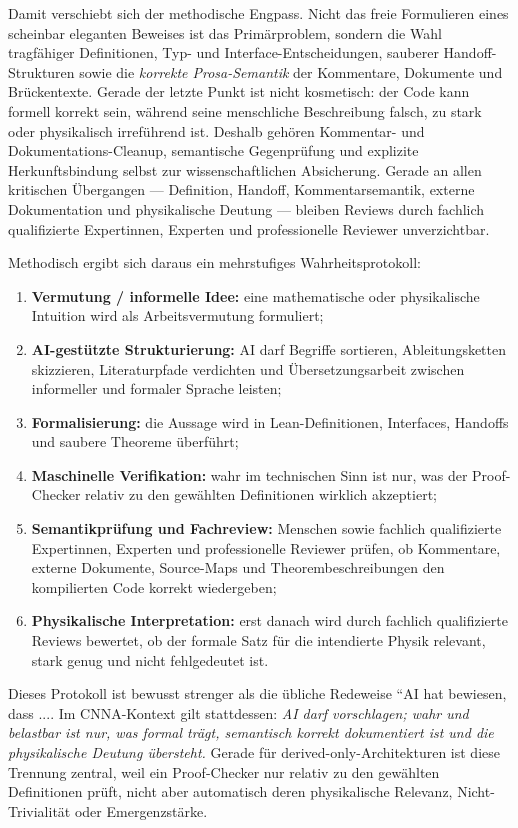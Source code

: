 \documentclass[11pt,a4paper]{article}
\begin{document}
Damit verschiebt sich der methodische Engpass. Nicht das freie Formulieren eines scheinbar eleganten
Beweises ist das Primärproblem, sondern die Wahl tragfähiger Definitionen, Typ- und
Interface-Entscheidungen, sauberer Handoff-Strukturen sowie die \emph{korrekte Prosa-Semantik} der
Kommentare, Dokumente und Brückentexte. Gerade der letzte Punkt ist nicht kosmetisch: der Code kann
formell korrekt sein, während seine menschliche Beschreibung falsch, zu stark oder physikalisch
irreführend ist. Deshalb gehören Kommentar- und Dokumentations-Cleanup, semantische
Gegenprüfung und explizite Herkunftsbindung selbst zur wissenschaftlichen Absicherung. Gerade an
allen kritischen Übergangen --- Definition, Handoff, Kommentarsemantik, externe Dokumentation und
physikalische Deutung --- bleiben Reviews durch fachlich qualifizierte Expertinnen, Experten und
professionelle Reviewer unverzichtbar.

Methodisch ergibt sich daraus ein mehrstufiges Wahrheitsprotokoll:
\begin{enumerate}
\item \textbf{Vermutung / informelle Idee:} eine mathematische oder physikalische Intuition wird als
Arbeitsvermutung formuliert;
\item \textbf{AI-gestützte Strukturierung:} AI darf Begriffe sortieren, Ableitungsketten skizzieren,
Literaturpfade verdichten und Übersetzungsarbeit zwischen informeller und formaler Sprache leisten;
\item \textbf{Formalisierung:} die Aussage wird in Lean-Definitionen, Interfaces, Handoffs und saubere
Theoreme überführt;
\item \textbf{Maschinelle Verifikation:} wahr im technischen Sinn ist nur, was der Proof-Checker relativ zu
den gewählten Definitionen wirklich akzeptiert;
\item \textbf{Semantikprüfung und Fachreview:} Menschen sowie fachlich qualifizierte Expertinnen,
Experten und professionelle Reviewer prüfen, ob Kommentare, externe Dokumente, Source-Maps und
Theorembeschreibungen den kompilierten Code korrekt wiedergeben;
\item \textbf{Physikalische Interpretation:} erst danach wird durch fachlich qualifizierte Reviews
bewertet, ob der formale Satz für die intendierte Physik relevant, stark genug und nicht
fehlgedeutet ist.
\end{enumerate}

Dieses Protokoll ist bewusst strenger als die übliche Redeweise ``AI hat bewiesen, dass ....
Im CNNA-Kontext gilt stattdessen: \emph{AI darf vorschlagen; wahr und belastbar ist nur, was formal
trägt, semantisch korrekt dokumentiert ist und die physikalische Deutung übersteht.} Gerade für
derived-only-Architekturen ist diese Trennung zentral, weil ein Proof-Checker nur relativ zu den
gewählten Definitionen prüft, nicht aber automatisch deren physikalische Relevanz,
Nicht-Trivialität oder Emergenzstärke.
\end{document}
